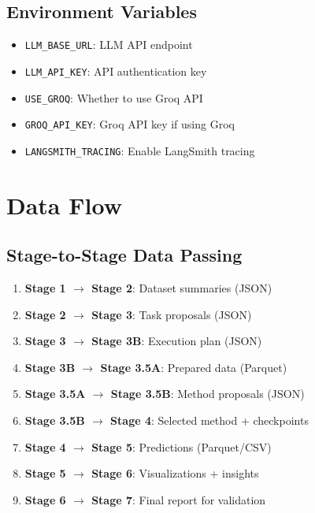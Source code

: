 \documentclass[12pt,a4paper]{report}
\begin{document}
\section{Environment Variables}
\begin{itemize}
    \item \texttt{LLM\_BASE\_URL}: LLM API endpoint
    \item \texttt{LLM\_API\_KEY}: API authentication key
    \item \texttt{USE\_GROQ}: Whether to use Groq API
    \item \texttt{GROQ\_API\_KEY}: Groq API key if using Groq
    \item \texttt{LANGSMITH\_TRACING}: Enable LangSmith tracing
\end{itemize}

\chapter{Data Flow}

\section{Stage-to-Stage Data Passing}
\begin{enumerate}
    \item \textbf{Stage 1 $\rightarrow$ Stage 2}: Dataset summaries (JSON)
    \item \textbf{Stage 2 $\rightarrow$ Stage 3}: Task proposals (JSON)
    \item \textbf{Stage 3 $\rightarrow$ Stage 3B}: Execution plan (JSON)
    \item \textbf{Stage 3B $\rightarrow$ Stage 3.5A}: Prepared data (Parquet)
    \item \textbf{Stage 3.5A $\rightarrow$ Stage 3.5B}: Method proposals (JSON)
    \item \textbf{Stage 3.5B $\rightarrow$ Stage 4}: Selected method + checkpoints
    \item \textbf{Stage 4 $\rightarrow$ Stage 5}: Predictions (Parquet/CSV)
    \item \textbf{Stage 5 $\rightarrow$ Stage 6}: Visualizations + insights
    \item \textbf{Stage 6 $\rightarrow$ Stage 7}: Final report for validation
\end{enumerate}
\end{document}
